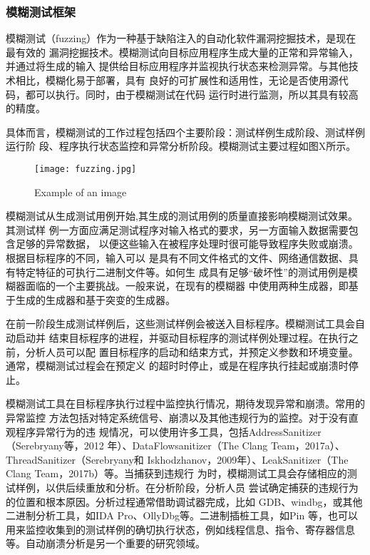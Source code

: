 
\subsubsection{模糊测试框架}
模糊测试（fuzzing）作为一种基于缺陷注入的自动化软件漏洞挖掘技术，是现在最有效的
漏洞挖掘技术。模糊测试向目标应用程序生成大量的正常和异常输入，并通过将生成的输入
提供给目标应用程序并监视执行状态来检测异常。与其他技术相比，模糊化易于部署，具有
良好的可扩展性和适用性，无论是否使用源代码，都可以执行。同时，由于模糊测试在代码
运行时进行监测，所以其具有较高的精度。

具体而言，模糊测试的工作过程包括四个主要阶段：测试样例生成阶段、测试样例运行阶
段、程序执行状态监控和异常分析阶段。模糊测试主要过程如图X所示。
\begin{figure}[ht]
	\centering
	\texttt{[image: fuzzing.jpg]}
	\caption{Example of an image}
	\label{fig:fuzzing}
\end{figure}

模糊测试从生成测试用例开始,其生成的测试用例的质量直接影响模糊测试效果。其测试样
例一方面应满足测试程序对输入格式的要求，另一方面输入数据需要包含足够的异常数据，
以便这些输入在被程序处理时很可能导致程序失败或崩溃。根据目标程序的不同，输入可以
是具有不同文件格式的文件、网络通信数据、具有特定特征的可执行二进制文件等。如何生
成具有足够“破坏性”的测试用例是模糊器面临的一个主要挑战。一般来说，在现有的模糊器
中使用两种生成器，即基于生成的生成器和基于突变的生成器。

在前一阶段生成测试样例后，这些测试样例会被送入目标程序。模糊测试工具会自动启动并
结束目标程序的进程，并驱动目标程序的测试样例处理过程。在执行之前，分析人员可以配
置目标程序的启动和结束方式，并预定义参数和环境变量。通常，模糊测试过程会在预定义
的超时时停止，或是在程序执行挂起或崩溃时停止。

模糊测试工具在目标程序执行过程中监控执行情况，期待发现异常和崩溃。常用的异常监控
方法包括对特定系统信号、崩溃以及其他违规行为的监控。对于没有直观程序异常行为的违
规情况，可以使用许多工具，包括AddressSanitizer（Serebryany等，2012
年）、DataFlowsanitizer（The Clang Team，2017a）、ThreadSanitizer（Serebryany和
Iskhodzhanov，2009年）、LeakSanitizer（The Clang Team，2017b）等。当捕获到违规行
为时，模糊测试工具会存储相应的测试样例，以供后续重放和分析。在分析阶段，分析人员
尝试确定捕获的违规行为的位置和根本原因。分析过程通常借助调试器完成，比如
GDB、windbg，或其他二进制分析工具，如IDA Pro、OllyDbg等。二进制插桩工具，如Pin
等，也可以用来监控收集到的测试样例的确切执行状态，例如线程信息、指令、寄存器信息
等。自动崩溃分析是另一个重要的研究领域。


